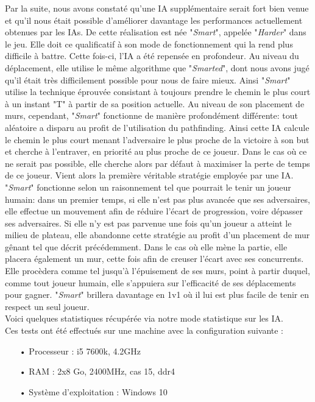 \documentclass[a4paper, 12pt]{article}
\begin{document}
Par la suite, nous avons constaté qu'une IA supplémentaire serait fort bien venue et qu'il nous était possible d'améliorer davantage les performances actuellement obtenues par les IAs. De cette réalisation est née "\textit{Smart}", appelée "\textit{Harder}" dans le jeu. Elle doit ce qualificatif à son mode de fonctionnement qui la rend plus difficile à battre.
Cette fois-ci, l'IA a été repensée en profondeur. Au niveau du déplacement, elle utilise le même algorithme que "\textit{Smarted}", dont nous avons jugé qu'il était très difficilement possible pour nous de faire mieux. Ainsi "\textit{Smart}" utilise la technique éprouvée consistant à toujours prendre le chemin le plus court à un instant "T" à partir de sa position actuelle. Au niveau de son placement de murs, cependant, "\textit{Smart}" fonctionne de manière profondément différente: tout aléatoire a disparu au profit de l'utilisation du pathfinding. Ainsi cette IA calcule le chemin le plus court menant l'adversaire le plus proche de la victoire à son but et cherche à l'entraver, en priorité au plus proche de ce joueur. Dans le cas où ce ne serait pas possible, elle cherche alors par défaut à maximiser la perte de temps de ce joueur.
Vient alors la première véritable stratégie employée par une IA. "\textit{Smart}" fonctionne selon un raisonnement tel que pourrait le tenir un joueur humain: dans un premier temps, si elle n'est pas plus avancée que ses adversaires, elle effectue un mouvement afin de réduire l'écart de progression, voire dépasser ses adversaires. Si elle n'y est pas parvenue une fois qu'un joueur a atteint le milieu de plateau, elle abandonne cette stratégie au profit d'un placement de mur gênant tel que décrit précédemment. Dans le cas où elle mène la partie, elle placera également un mur, cette fois afin de creuser l'écart avec ses concurrents. Elle procèdera comme tel jusqu'à l'épuisement de ses murs, point à partir duquel, comme tout joueur humain, elle s'appuiera sur l'efficacité de ses déplacements pour gagner.
"\textit{Smart}" brillera davantage en 1v1 où il lui est plus facile de tenir en respect un seul joueur. \\

Voici quelques statistiques récupérée via notre mode statistique sur les IA. \\
Ces tests ont été effectués sur une machine avec la configuration suivante :
\begin{itemize}
\item[•] Processeur : i5 7600k, 4.2GHz
\item[•] RAM : 2x8 Go, 2400MHz, cas 15, ddr4
\item[•] Système d'exploitation : Windows 10
\end{itemize}
\end{document}
